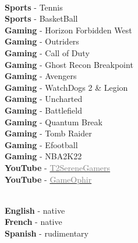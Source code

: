 \documentclass[9pt]{adeckcv} %
\begin{document}
\begin{minipage}[t]{0.3\textwidth}
\vspace{-\baselineskip} %
\\
\textbf{Sports} - Tennis\\
\textbf{Sports} - BasketBall\\
\textbf{Gaming} - Horizon Forbidden West \\
\textbf{Gaming} - Outriders \\
\textbf{Gaming} - Call of Duty \\
\textbf{Gaming} - Ghost Recon Breakpoint \\
\textbf{Gaming} - Avengers \\
\textbf{Gaming} - WatchDogs 2 \& Legion \\
\textbf{Gaming} - Uncharted \\
\textbf{Gaming} - Battlefield \\
\textbf{Gaming} - Quantum Break \\
\textbf{Gaming} - Tomb Raider \\
\textbf{Gaming} - Efootball \\
\textbf{Gaming} - NBA2K22 \\
\textbf{YouTube} - \href{https://www.youtube.com/@t2serenegamers67}{\textcolor{gray}{T2SereneGamers}} \\
\textbf{YouTube} - \href{https://www.youtube.com/@gameophir5827}{\textcolor{gray}{GameOphir}}
\end{minipage}
\hfill
\begin{minipage}[t]{0.3\textwidth}
\vspace{-\baselineskip} %

\\
\textbf{English} - native\\
\textbf{French} - native\\
\textbf{Spanish} - rudimentary
\end{minipage}

  
  
\end{document}
